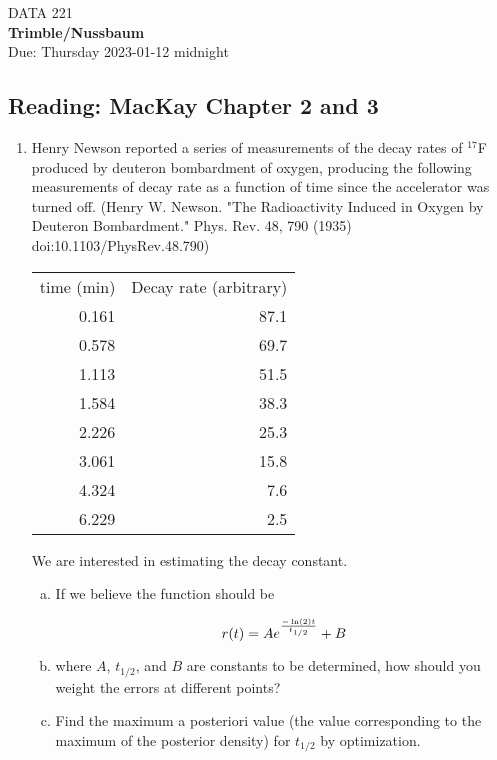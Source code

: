 \documentclass[12pt]{book}
\theoremstyle{definition}
\begin{document}
\begin{center}
{\Large DATA 221   }\\
\textbf{Trimble/Nussbaum}\\ %
Due: Thursday 2023-01-12  midnight
\end{center}

\vspace{0.2 cm}

\subsection*{Reading:  MacKay Chapter 2 and 3}

\begin{enumerate}
\item Henry Newson reported a series of measurements of the decay rates of $^{17}$F produced by deuteron bombardment of oxygen, producing the following measurements of decay rate as a function of time since the accelerator was turned off. (Henry W. Newson.  "The Radioactivity Induced in Oxygen by Deuteron Bombardment." Phys. Rev. 48, 790 (1935) doi:10.1103/PhysRev.48.790)

\begin{tabular}{rr} \\
time (min) &    Decay rate (arbitrary) \\
0.161 & 87.1 \\
0.578 & 69.7 \\
1.113 & 51.5 \\
1.584 & 38.3 \\
2.226 & 25.3 \\
3.061 & 15.8 \\
4.324 & 7.6 \\
6.229 & 2.5 \\
\end{tabular}

We are interested in estimating the decay constant.  

 \begin{enumerate}[a.]
  \item If we believe the function should be 
 
$$ r(t) = A e ^{ - \ln (2) t \over t_{1/2} } + B $$

  \item[] where $A$, $t_{1/2}$, and $B$ are constants to be determined, how should you weight the errors at different points?
  \item Find the maximum a posteriori value (the value corresponding to the  maximum of the posterior density) for $t_{1/2} $ by optimization.
 \end{enumerate}


\end{enumerate}
\end{document}
